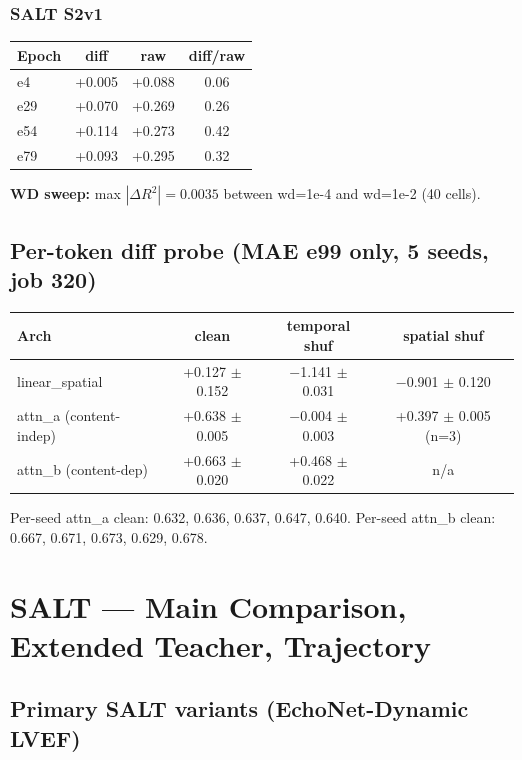 \documentclass{article}
\begin{document}
\subsubsection{SALT S2v1}
\begin{center}
\begin{tabular}{lccc}
\toprule
Epoch & diff & raw & diff/raw \\
\midrule
e4  & +0.005 & +0.088 & 0.06 \\
e29 & +0.070 & +0.269 & 0.26 \\
e54 & +0.114 & +0.273 & 0.42 \\
e79 & +0.093 & +0.295 & 0.32 \\
\bottomrule
\end{tabular}
\end{center}

\textbf{WD sweep:} max $|\Delta R^2| = 0.0035$ between wd=1e-4 and wd=1e-2 (40 cells).

\subsection{Per-token diff probe (MAE e99 only, 5 seeds, job 320)}

\begin{center}
\begin{tabular}{lccc}
\toprule
Arch & clean & temporal shuf & spatial shuf \\
\midrule
linear\_spatial & +0.127 $\pm$ 0.152 & $-$1.141 $\pm$ 0.031 & $-$0.901 $\pm$ 0.120 \\
attn\_a (content-indep) & +0.638 $\pm$ 0.005 & $-$0.004 $\pm$ 0.003 & +0.397 $\pm$ 0.005 (n=3) \\
attn\_b (content-dep) & +0.663 $\pm$ 0.020 & +0.468 $\pm$ 0.022 & n/a \\
\bottomrule
\end{tabular}
\end{center}
Per-seed attn\_a clean: 0.632, 0.636, 0.637, 0.647, 0.640. Per-seed attn\_b clean: 0.667, 0.671, 0.673, 0.629, 0.678.

\section{SALT --- Main Comparison, Extended Teacher, Trajectory}

\subsection{Primary SALT variants (EchoNet-Dynamic LVEF)}
\end{document}
